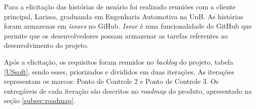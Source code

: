 	Para a elicitação das histórias de usuário foi realizado reuniões com a cliente principal, Larissa, graduanda em Engenharia Automotiva na UnB. As histórias foram armazenas em \textit{issues} no GiHub. \textit{Issue} é uma funcionalidade do GitHub que permite que os desenvolvedores possam armazenar as tarefas referentes ao desenvolvimento do projeto.

	Após a elicitação, os requisitos foram reunidos no \textit{backlog} do projeto, tabela \ref{USsoft}, sendo esses, priorizados e divididos em duas iterações. As iterações representam os marcos: Ponto de Controle 2 e Ponto de Controle 3. Os entregáveis de cada iteração são descritos no \textit{roadmap} do produto, apresentado na seção \ref{subsec:roadmap}.

	\begin{table}[!h]
		\centering
		\caption{Histórias de Usuário}
		\label{USsoft}
\end{table}
